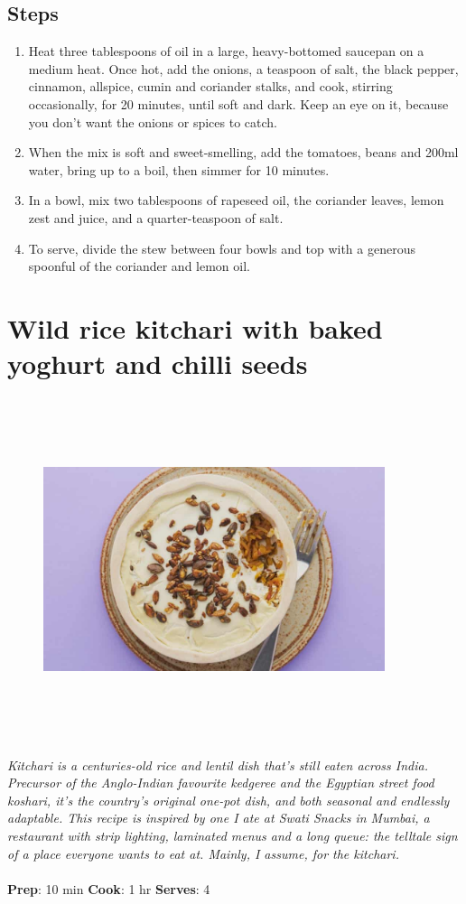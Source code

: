 \documentclass{book}
\begin{document}
\subsection*{Steps}
\begin{enumerate}
\item Heat three tablespoons of oil in a large, heavy-bottomed saucepan on a medium heat. Once hot, add the onions, a teaspoon of salt, the black pepper, cinnamon, allspice, cumin and coriander stalks, and cook, stirring occasionally, for 20 minutes, until soft and dark. Keep an eye on it, because you don’t want the onions or spices to catch.
\item When the mix is soft and sweet-smelling, add the tomatoes, beans and 200ml water, bring up to a boil, then simmer for 10 minutes.
\item In a bowl, mix two tablespoons of rapeseed oil, the coriander leaves, lemon zest and juice, and a quarter-teaspoon of salt.
\item To serve, divide the stew between four bowls and top with a generous spoonful of the coriander and lemon oil.
\end{enumerate}
\newpage

\section{Wild rice kitchari with baked yoghurt and chilli seeds}
\begin{figure}
\centering\includegraphics[width=10cm,height=10cm,keepaspectratio]{Recipe_Pictures/Wild_rice_kitchari_with_baked_yoghurt_and_chilli_seeds.png}
\end{figure}
\emph{Kitchari is a centuries-old rice and lentil dish that’s still eaten across India. Precursor of the Anglo-Indian favourite kedgeree and the Egyptian street food koshari, it’s the country’s original one-pot dish, and both seasonal and endlessly adaptable. This recipe is inspired by one I ate at Swati Snacks in Mumbai, a restaurant with strip lighting, laminated menus and a long queue: the telltale sign of a place everyone wants to eat at. Mainly, I assume, for the kitchari.}\\\\ 
\textbf{Prep}: 10 min
\textbf{Cook}: 1 hr
\textbf{Serves}: 4
\end{document}
